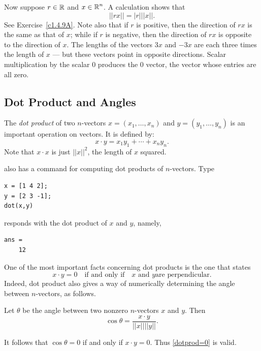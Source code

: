 \documentclass{ximera}
\begin{document}
Now suppose $r\in\mbox{$\mathbb{R}$}$ and $x\in\mbox{$\mathbb{R}$}^n$.  A calculation shows that
\begin{equation}  \label{E:lengths}
||rx||  = |r| ||x||.
\end{equation}
See Exercise~\ref{c1.4.9A}.  Note also that if $r$ is positive, 
then the direction of $rx$
is the same as that of $x$; while if $r$ is negative, then the
direction of $rx$ is opposite to the direction of $x$.  The
lengths of the vectors $3x$ and $-3x$ are each three times the
length of $x$ --- but these vectors point in opposite
directions.  Scalar multiplication by the scalar $0$ produces
the $0$ vector, the vector whose entries are all zero.

\subsection*{Dot Product and Angles}

The {\em dot product\/} of two $n$-vectors
$x=(x_1,\ldots,x_n)$ and $y=(y_1,\ldots,y_n)$ is an important
operation on vectors.  It is defined by:
\begin{equation}  \label{e:dotproduct}
x\cdot y = x_1y_1 + \cdots + x_ny_n.
\end{equation}
Note that $x\cdot x$ is just $||x||^2$, the length of $x$
squared.

\Matlab also has a command for computing dot products of
$n$-vectors.  Type
\begin{verbatim}
x = [1 4 2];
y = [2 3 -1];
dot(x,y)
\end{verbatim}
\Matlab responds with the dot product of $x$ and $y$, namely,
\begin{verbatim}
ans =
    12
\end{verbatim}

One of the most important facts concerning dot products is the
one that states
\begin{equation} \label{dotprod=0}
x\cdot y = 0 \quad \mbox{if and only if} \quad \mbox{$x$ and $y$
are perpendicular}.
\end{equation}  
Indeed, dot product also gives a way of numerically determining
the angle between $n$-vectors, as follows.
\begin{theorem} \label{T:dotangle}
Let $\theta$ be the angle between two nonzero $n$-vectors $x$
and $y$.  Then
\begin{equation}  \label{e:dotproductang}
\cos \theta = \frac{x\cdot y}{||x|| ||y||}.
\end{equation}
\end{theorem}
It follows that $\cos \theta=0$
if and only if $x\cdot y = 0$.  Thus \eqref{dotprod=0} is valid.
\end{document}
